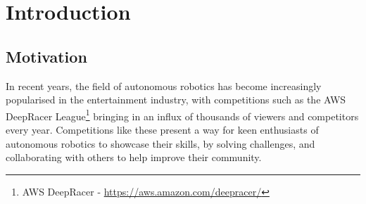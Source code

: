 \documentclass{l4proj}
\begin{document}

\def\consentname {Lewis Trundle}
\def\consentdate {31 March 2023}
\educationalconsent


\tableofcontents

%
%
%
%
%
%
\chapter{Introduction}

\section{Motivation}\label{sec:motivation}
In recent years, the field of autonomous robotics has become increasingly popularised in the entertainment industry, with competitions such as the AWS DeepRacer League\footnote{AWS DeepRacer - \url{https://aws.amazon.com/deepracer/}} bringing in an influx of thousands of viewers and competitors every year. Competitions like these present a way for keen enthusiasts of autonomous robotics to showcase their skills, by solving challenges, and collaborating with others to help improve their community.
\end{document}

